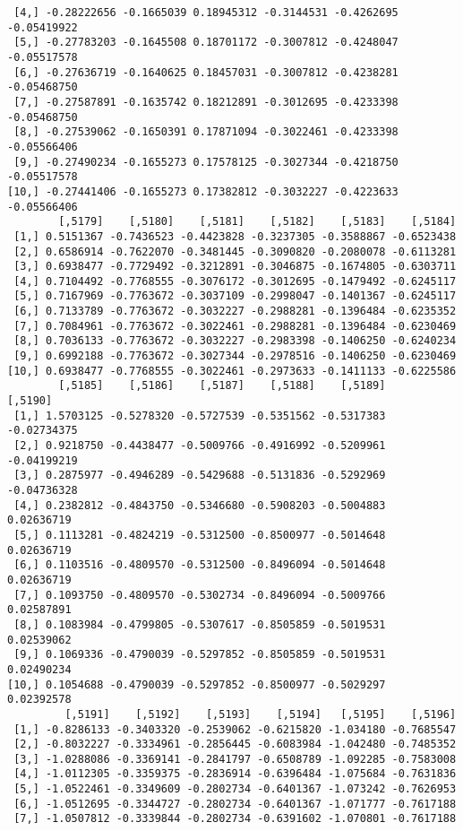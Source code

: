 \documentclass[
  letterpaper,
  DIV=11,
  numbers=noendperiod]{scrreprt}
\begin{document}
\begin{verbatim}
 [4,] -0.28222656 -0.1665039 0.18945312 -0.3144531 -0.4262695 -0.05419922
 [5,] -0.27783203 -0.1645508 0.18701172 -0.3007812 -0.4248047 -0.05517578
 [6,] -0.27636719 -0.1640625 0.18457031 -0.3007812 -0.4238281 -0.05468750
 [7,] -0.27587891 -0.1635742 0.18212891 -0.3012695 -0.4233398 -0.05468750
 [8,] -0.27539062 -0.1650391 0.17871094 -0.3022461 -0.4233398 -0.05566406
 [9,] -0.27490234 -0.1655273 0.17578125 -0.3027344 -0.4218750 -0.05517578
[10,] -0.27441406 -0.1655273 0.17382812 -0.3032227 -0.4223633 -0.05566406
        [,5179]    [,5180]    [,5181]    [,5182]    [,5183]    [,5184]
 [1,] 0.5151367 -0.7436523 -0.4423828 -0.3237305 -0.3588867 -0.6523438
 [2,] 0.6586914 -0.7622070 -0.3481445 -0.3090820 -0.2080078 -0.6113281
 [3,] 0.6938477 -0.7729492 -0.3212891 -0.3046875 -0.1674805 -0.6303711
 [4,] 0.7104492 -0.7768555 -0.3076172 -0.3012695 -0.1479492 -0.6245117
 [5,] 0.7167969 -0.7763672 -0.3037109 -0.2998047 -0.1401367 -0.6245117
 [6,] 0.7133789 -0.7763672 -0.3032227 -0.2988281 -0.1396484 -0.6235352
 [7,] 0.7084961 -0.7763672 -0.3022461 -0.2988281 -0.1396484 -0.6230469
 [8,] 0.7036133 -0.7763672 -0.3032227 -0.2983398 -0.1406250 -0.6240234
 [9,] 0.6992188 -0.7763672 -0.3027344 -0.2978516 -0.1406250 -0.6230469
[10,] 0.6938477 -0.7768555 -0.3022461 -0.2973633 -0.1411133 -0.6225586
        [,5185]    [,5186]    [,5187]    [,5188]    [,5189]     [,5190]
 [1,] 1.5703125 -0.5278320 -0.5727539 -0.5351562 -0.5317383 -0.02734375
 [2,] 0.9218750 -0.4438477 -0.5009766 -0.4916992 -0.5209961 -0.04199219
 [3,] 0.2875977 -0.4946289 -0.5429688 -0.5131836 -0.5292969 -0.04736328
 [4,] 0.2382812 -0.4843750 -0.5346680 -0.5908203 -0.5004883  0.02636719
 [5,] 0.1113281 -0.4824219 -0.5312500 -0.8500977 -0.5014648  0.02636719
 [6,] 0.1103516 -0.4809570 -0.5312500 -0.8496094 -0.5014648  0.02636719
 [7,] 0.1093750 -0.4809570 -0.5302734 -0.8496094 -0.5009766  0.02587891
 [8,] 0.1083984 -0.4799805 -0.5307617 -0.8505859 -0.5019531  0.02539062
 [9,] 0.1069336 -0.4790039 -0.5297852 -0.8505859 -0.5019531  0.02490234
[10,] 0.1054688 -0.4790039 -0.5297852 -0.8500977 -0.5029297  0.02392578
         [,5191]    [,5192]    [,5193]    [,5194]   [,5195]    [,5196]
 [1,] -0.8286133 -0.3403320 -0.2539062 -0.6215820 -1.034180 -0.7685547
 [2,] -0.8032227 -0.3334961 -0.2856445 -0.6083984 -1.042480 -0.7485352
 [3,] -1.0288086 -0.3369141 -0.2841797 -0.6508789 -1.092285 -0.7583008
 [4,] -1.0112305 -0.3359375 -0.2836914 -0.6396484 -1.075684 -0.7631836
 [5,] -1.0522461 -0.3349609 -0.2802734 -0.6401367 -1.073242 -0.7626953
 [6,] -1.0512695 -0.3344727 -0.2802734 -0.6401367 -1.071777 -0.7617188
 [7,] -1.0507812 -0.3339844 -0.2802734 -0.6391602 -1.070801 -0.7617188

\end{verbatim}
\end{document}
